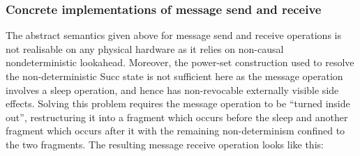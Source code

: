 \subsubsection{Concrete implementations of message send and receive}

The abstract semantics given above for message send and receive
operations is not realisable on any physical hardware as it relies on
non-causal nondeterministic lookahead.  Moreover, the power-set
construction used to resolve the non-deterministic Succ state is not
sufficient here as the message operation involves a sleep operation,
and hence has non-revocable externally visible side effects.  Solving
this problem requires the message operation to be ``turned inside
out'', restructuring it into a fragment which occurs before the sleep
and another fragment which occurs after it with the remaining
non-determinism confined to the two fragments.  The resulting message
receive operation looks like this:


